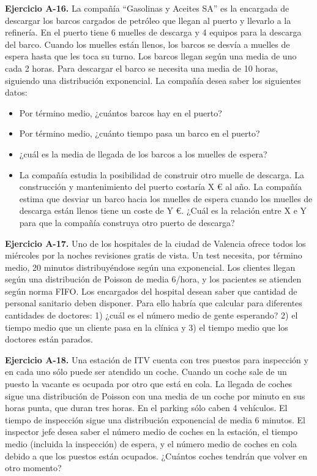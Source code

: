 \documentclass[
]{book}
\providecommand{\tightlist}{%
  \setlength{\itemsep}{0pt}\setlength{\parskip}{0pt}}
\theoremstyle{definition}
\theoremstyle{definition}
\theoremstyle{definition}
\theoremstyle{definition}
\theoremstyle{remark}
\begin{document}
\textbf{Ejercicio A-16.} La compañía ``Gasolinas y Aceites SA'' es la encargada de descargar los barcos cargados de petróleo que llegan al puerto y llevarlo a la refinería. En el puerto tiene 6 muelles de descarga y 4 equipos para la descarga del barco. Cuando los muelles están llenos, los barcos se desvía a muelles de espera hasta que les toca su turno. Los barcos llegan según una media de uno cada 2 horas. Para descargar el barco se necesita una media de 10 horas, siguiendo una distribución exponencial. La compañía desea saber los siguientes datos:

\begin{itemize}
\tightlist
\item
  Por término medio, ¿cuántos barcos hay en el puerto?
\item
  Por término medio, ¿cuánto tiempo pasa un barco en el puerto?
\item
  ¿cuál es la media de llegada de los barcos a los muelles de espera?
\item
  La compañía estudia la posibilidad de construir otro muelle de descarga. La construcción y mantenimiento del puerto costaría X € al año. La compañía estima que desviar un barco hacia los muelles de espera cuando los muelles de descarga están llenos tiene un coste de Y €. ¿Cuál es la relación entre X e Y para que la compañía construya otro puerto de descarga?
\end{itemize}

\textbf{Ejercicio A-17.} Uno de los hospitales de la ciudad de Valencia ofrece todos los miércoles por la noches revisiones gratis de vista. Un test necesita, por término medio, 20 minutos distribuyéndose según una exponencial. Los clientes llegan según una distribución de Poisson de media 6/hora, y los pacientes se atienden según norma FIFO. Los encargados del hospital desean saber que cantidad de personal sanitario deben disponer. Para ello habría que calcular para diferentes cantidades de doctores: 1) ¿cuál es el número medio de gente esperando? 2) el tiempo medio que un cliente pasa en la clínica y 3) el tiempo medio que los doctores están parados.

\textbf{Ejercicio A-18.} Una estación de ITV cuenta con tres puestos para inspección y en cada uno sólo puede ser atendido un coche. Cuando un coche sale de un puesto la vacante es ocupada por otro que está en cola. La llegada de coches sigue una distribución de Poisson con una media de un coche por minuto en sus horas punta, que duran tres horas. En el parking sólo caben 4 vehículos. El tiempo de inspección sigue una distribución exponencial de media 6 minutos. El inspector jefe desea saber el número medio de coches en la estación, el tiempo medio (incluida la inspección) de espera, y el número medio de coches en cola debido a que los puestos están ocupados. ¿Cuántos coches tendrán que volver en otro momento?
\end{document}
